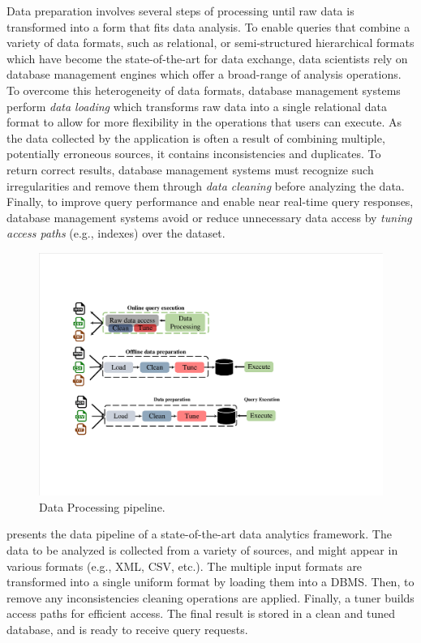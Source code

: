 Data preparation involves several steps of processing until raw data
is transformed
into a form that fits data analysis.
To enable queries that combine a variety of data formats, such as
relational, or semi-structured hierarchical formats which have become 
the state-of-the-art for data exchange, data scientists rely on 
database management engines which offer a broad-range of analysis 
operations.  
To overcome this heterogeneity of data formats, database management 
systems perform \textit{data loading} which transforms raw data into 
a single relational data format to allow for more flexibility in
the operations that users can execute.
As the data collected by the application is often a result of 
combining multiple, potentially erroneous sources, it 
contains inconsistencies and duplicates. To return correct 
results, database management systems 
must recognize such irregularities and remove them through 
\textit{data cleaning} before analyzing the data.
Finally, to improve query performance and enable near real-time query 
responses, database management systems avoid or reduce unnecessary 
data access by \textit{tuning access paths} (e.g., indexes) over the 
dataset.
\begin{figure}[t]
	\begin{center}
		\includegraphics[page=1,width=0.7\columnwidth]{figs/data-preparation-offline}
		\caption{Data Processing pipeline.}
		\label{fig:alternatives}
	\end{center}
	\vspace{-2em}
\end{figure}
%
 presents the data pipeline of a 
state-of-the-art data analytics framework. The data to be analyzed is collected 
from a variety of sources, and might appear in various formats (e.g., XML, CSV, etc.). 
The multiple input formats are transformed into a single uniform format by loading
them into a DBMS. Then, to remove any inconsistencies cleaning operations are applied. Finally, 
a tuner builds access paths for 
efficient access. The final result is stored in a clean and tuned 
database, and is ready to receive query requests.

